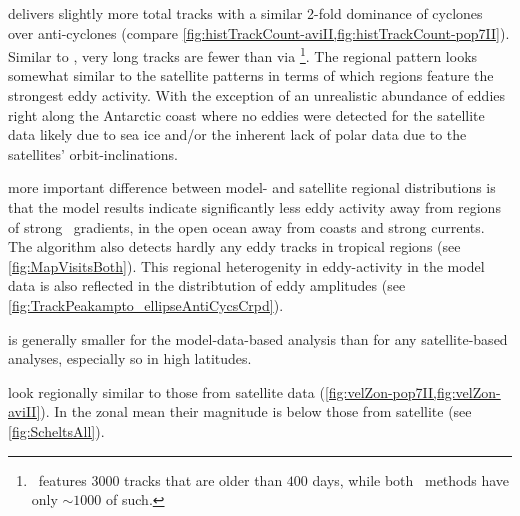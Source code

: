 \renewcommand{\run}[1]{#1-pop7II}
\renewcommand{\RUN}{pop7-\MII: }

 delivers slightly more total tracks with a similar 2-fold dominance of cyclones over anti-cyclones (compare \cref{fig:histTrackCount-aviII,fig:histTrackCount-pop7II}). Similar to \aviII, very long tracks are fewer than via \aviI \footnote{\aviI~features $3000$ tracks that are older than $400$ days, while both \MII~methods have only $\sim1000$ of such.}. The regional pattern looks somewhat similar to the satellite patterns in terms of which regions feature the strongest eddy activity. With the exception of an unrealistic abundance of eddies right along the Antarctic coast  where no eddies were detected for the satellite data likely due to sea ice and/or the inherent lack of polar data due to the satellites' orbit-inclinations.

 more important difference between model- and satellite regional distributions is that the model results indicate significantly less eddy activity away from regions of strong \SSH~gradients, in the open ocean away from coasts and strong currents. The algorithm also detects hardly any eddy tracks in tropical regions (see \cref{fig:MapVisitsBoth}). This regional heterogenity in eddy-activity in the model data is also reflected in the distribtution of eddy amplitudes (see \cref{fig:TrackPeakampto_ellipseAntiCycsCrpd}).

 is generally smaller for the model-data-based analysis than for any satellite-based analyses, especially so in high latitudes.

 look regionally similar to those from satellite data (\cref{fig:velZon-pop7II,fig:velZon-aviII}). In the zonal mean their magnitude is below those from satellite (see \cref{fig:ScheltsAll}).

